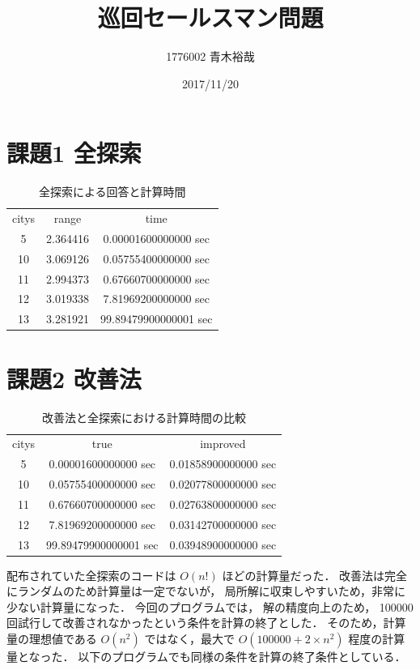 \documentclass{jsarticle}
\title{巡回セールスマン問題}
\author{1776002 青木裕哉}
\date{2017/11/20}
\begin{document}
\fontsize{10pt}{12pt}\selectfont
\maketitle

\section{課題1 全探索}
\begin{table}
  \centering
	\begin{tabular}[p]{ccc}
		\toprule
		citys & range & time \\
		5 & 2.364416 & 0.00001600000000 sec \\
		10 & 3.069126 & 0.05755400000000 sec \\
		11 & 2.994373 & 0.67660700000000 sec \\
		12 & 3.019338 & 7.81969200000000 sec \\
		13 & 3.281921 & 99.89479900000001 sec \\
		\bottomrule
	\end{tabular}
	\caption{全探索による回答と計算時間}
\end{table}


\section{課題2 改善法}
\begin{table}
  \centering
	\begin{tabular}[p]{ccc}
		\toprule
		citys & true & improved \\
		5  & 0.00001600000000 sec  &  0.01858900000000 sec \\
		10 & 0.05755400000000 sec  &  0.02077800000000 sec \\
		11 & 0.67660700000000 sec  &  0.02763800000000 sec \\
		12 & 7.81969200000000 sec  &  0.03142700000000 sec \\
		13 & 99.89479900000001 sec &  0.03948900000000 sec \\
		\bottomrule
	\end{tabular}
	  \caption{改善法と全探索における計算時間の比較}
\end{table}

配布されていた全探索のコードは
$O(n!)$ ほどの計算量だった．
改善法は完全にランダムのため計算量は一定でないが，
局所解に収束しやすいため，非常に少ない計算量になった．
今回のプログラムでは，
解の精度向上のため，
100000回試行して改善されなかったという条件を計算の終了とした．
そのため，計算量の理想値である
$O(n^2)$
ではなく，最大で
$O(100000 + 2 \times n^2)$
程度の計算量となった．
以下のプログラムでも同様の条件を計算の終了条件としている．
\end{document}
